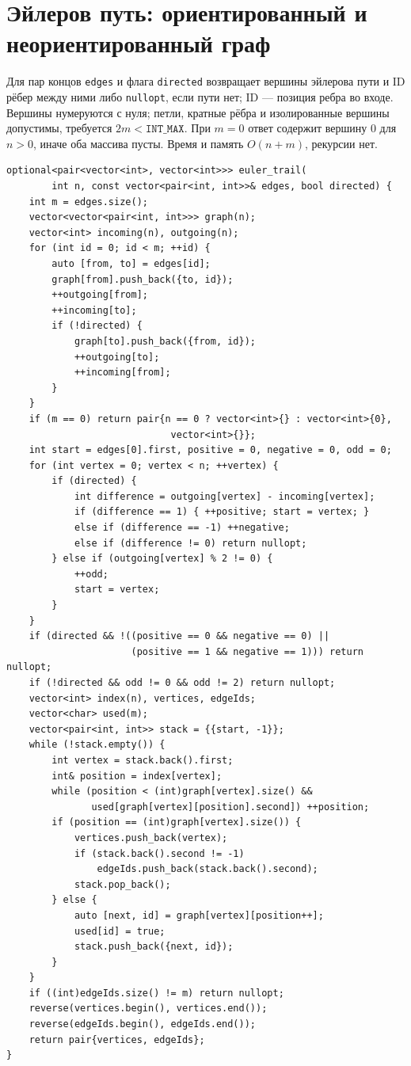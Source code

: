 \section{Эйлеров путь: ориентированный и неориентированный граф}
Для пар концов \texttt{edges} и флага \texttt{directed} возвращает вершины эйлерова пути и ID рёбер между ними либо \texttt{nullopt}, если пути нет; ID --- позиция ребра во входе.
Вершины нумеруются с нуля; петли, кратные рёбра и изолированные вершины допустимы, требуется $2m<\texttt{INT\_MAX}$.
При $m=0$ ответ содержит вершину 0 для $n>0$, иначе оба массива пусты.
Время и память $O(n+m)$, рекурсии нет.
\begin{lstlisting}[name=extra_graph_euler]
optional<pair<vector<int>, vector<int>>> euler_trail(
        int n, const vector<pair<int, int>>& edges, bool directed) {
    int m = edges.size();
    vector<vector<pair<int, int>>> graph(n);
    vector<int> incoming(n), outgoing(n);
    for (int id = 0; id < m; ++id) {
        auto [from, to] = edges[id];
        graph[from].push_back({to, id});
        ++outgoing[from];
        ++incoming[to];
        if (!directed) {
            graph[to].push_back({from, id});
            ++outgoing[to];
            ++incoming[from];
        }
    }
    if (m == 0) return pair{n == 0 ? vector<int>{} : vector<int>{0},
                             vector<int>{}};
    int start = edges[0].first, positive = 0, negative = 0, odd = 0;
    for (int vertex = 0; vertex < n; ++vertex) {
        if (directed) {
            int difference = outgoing[vertex] - incoming[vertex];
            if (difference == 1) { ++positive; start = vertex; }
            else if (difference == -1) ++negative;
            else if (difference != 0) return nullopt;
        } else if (outgoing[vertex] % 2 != 0) {
            ++odd;
            start = vertex;
        }
    }
    if (directed && !((positive == 0 && negative == 0) ||
                      (positive == 1 && negative == 1))) return nullopt;
    if (!directed && odd != 0 && odd != 2) return nullopt;
    vector<int> index(n), vertices, edgeIds;
    vector<char> used(m);
    vector<pair<int, int>> stack = {{start, -1}};
    while (!stack.empty()) {
        int vertex = stack.back().first;
        int& position = index[vertex];
        while (position < (int)graph[vertex].size() &&
               used[graph[vertex][position].second]) ++position;
        if (position == (int)graph[vertex].size()) {
            vertices.push_back(vertex);
            if (stack.back().second != -1)
                edgeIds.push_back(stack.back().second);
            stack.pop_back();
        } else {
            auto [next, id] = graph[vertex][position++];
            used[id] = true;
            stack.push_back({next, id});
        }
    }
    if ((int)edgeIds.size() != m) return nullopt;
    reverse(vertices.begin(), vertices.end());
    reverse(edgeIds.begin(), edgeIds.end());
    return pair{vertices, edgeIds};
}
\end{lstlisting}
